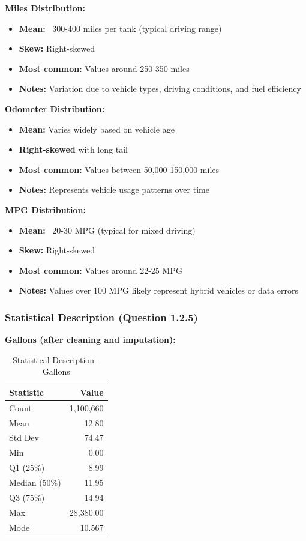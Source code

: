 \documentclass{article}
\begin{document}
\textbf{Miles Distribution:}
\begin{itemize}
    \item \textbf{Mean:} ~300-400 miles per tank (typical driving range)
    \item \textbf{Skew:} Right-skewed
    \item \textbf{Most common:} Values around 250-350 miles
    \item \textbf{Notes:} Variation due to vehicle types, driving conditions, and fuel efficiency
\end{itemize}

\textbf{Odometer Distribution:}
\begin{itemize}
    \item \textbf{Mean:} Varies widely based on vehicle age
    \item \textbf{Right-skewed} with long tail
    \item \textbf{Most common:} Values between 50,000-150,000 miles
    \item \textbf{Notes:} Represents vehicle usage patterns over time
\end{itemize}

\textbf{MPG Distribution:}
\begin{itemize}
    \item \textbf{Mean:} ~20-30 MPG (typical for mixed driving)
    \item \textbf{Skew:} Right-skewed
    \item \textbf{Most common:} Values around 22-25 MPG
    \item \textbf{Notes:} Values over 100 MPG likely represent hybrid vehicles or data errors
\end{itemize}

\vspace{2cm}

\subsubsection{Statistical Description (Question 1.2.5)}

\textbf{Gallons (after cleaning and imputation):}

\begin{table}[H]
    \centering
    \caption{Statistical Description - Gallons}
    \begin{tabular}{l r}
        \toprule
        \textbf{Statistic} & \textbf{Value} \\
        \midrule
        Count & 1,100,660 \\
        Mean & 12.80 \\
        Std Dev & 74.47 \\
        Min & 0.00 \\
        Q1 (25\%) & 8.99 \\
        Median (50\%) & 11.95 \\
        Q3 (75\%) & 14.94 \\
        Max & 28,380.00 \\
        Mode & 10.567 \\
        \bottomrule
    \end{tabular}
    \label{tab:stats_gallons}
\end{table}
\end{document}
